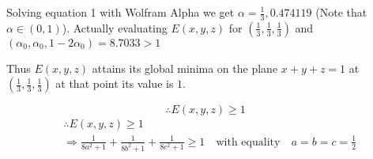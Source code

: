 \documentclass[a4paper,10pt]{article}
\begin{document}
  Solving equation 1 with Wolfram Alpha we get $\alpha = \frac{1}{3}, 0.474119$ (Note that $\alpha \in (0,1)$). Actually evaluating 
  $E(x,y,z) $ for $(\frac{1}{3},\frac{1}{3},\frac{1}{3})$ and $(\alpha_{0},\alpha_{0},1-2\alpha_{0})= 8.7033     >1$
  
  Thus $E(x,y,z)$ attains its global minima on the plane $x+y+z=1$ at  $(\frac{1}{3},\frac{1}{3},\frac{1}{3})$ at that point its value is $1$.
  
  $$\therefore E(x,y,z) \ge 1 $$
\begin{align*}
 & \therefore E(x,y,z) \ge 1 \\
 & \Rightarrow \frac{1}{8a^2+1} + \frac{1}{8b^2+1}+\frac{1}{8c^2+1} \ge 1 &\ \text{with equality} &\ a=b=c=\frac{1}{2}
\end{align*}
\end{document}
